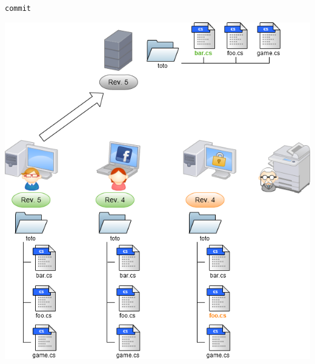 \begin{frame}
  \texttt{commit}
  \begin{center}
    \vspace{-12pt}
    \includegraphics[scale=0.3]{images/4-Commit1.png}
  \end{center}
\end{frame}

